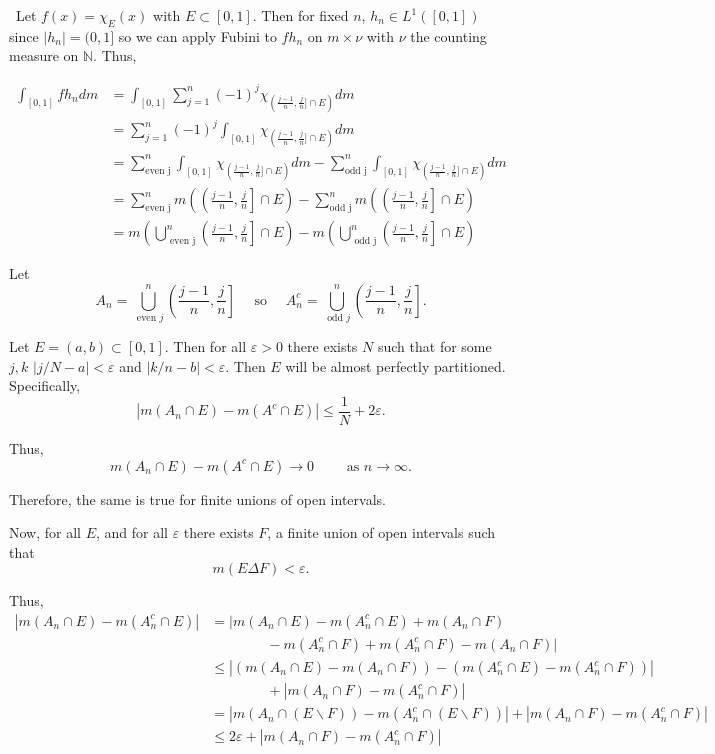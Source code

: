 \documentclass[12pt]{Homework}
\begin{document}
\begin{solution}$\,$
Let $f(x)=\chi_E(x)$ with $E\subset[0,1]$. Then for fixed $n$, $h_n\in L^1([0,1])$ since $|h_n|=(0,1]$ so we can apply Fubini to $fh_n$ on $m\times \nu$ with $\nu$ the counting measure on $\mathbb{N}$. Thus,

\begin{align*}
    \int_{[0,1]}fh_ndm&=\int_{[0,1]}\sum_{j=1}^n(-1)^j\chi_{(\frac{j-1}{n},\frac{j}{n}]\cap E)}dm\\
    &=\sum_{j=1}^n(-1)^j\int_{[0,1]}\chi_{(\frac{j-1}{n},\frac{j}{n}]\cap E)}dm\\
    &=\sum_{\text{even j}}^n\int_{[0,1]}\chi_{(\frac{j-1}{n},\frac{j}{n}]\cap E)}dm-\sum_{\text{odd j}}^n\int_{[0,1]}\chi_{(\frac{j-1}{n},\frac{j}{n}]\cap E)}dm\\
    &=\sum_{\text{even j}}^nm\left(\left(\frac{j-1}{n},\frac{j}{n}\right]\cap E\right)-\sum_{\text{odd j}}^nm\left(\left(\frac{j-1}{n},\frac{j}{n}\right]\cap E\right)\\
    &=m\left(\bigcup_{\text{ even j}}^n\left(\frac{j-1}{n},\frac{j}{n}\right]\cap E\right)-m\left(\bigcup_{\text{ odd j}}^n\left(\frac{j-1}{n},\frac{j}{n}\right]\cap E\right)
\end{align*}

Let $$A_n=\bigcup_{\text{ even }j}^n\left(\frac{j-1}{n},\frac{j}{n}\right]\quad\text{ so }\quad A_n^c=\bigcup_{\text{ odd }j}^n\left(\frac{j-1}{n},\frac{j}{n}\right].$$

Let $E=(a,b)\subset[0,1]$. Then for all $\varepsilon>0$ there exists $N$ such that for some $j,k$ $|j/N-a|<\varepsilon$ and $|k/n-b|<\varepsilon$. Then $E$ will be almost perfectly partitioned. Specifically, $$|m(A_n\cap E)-m(A^c\cap E)|\le\frac{1}{N}+2\varepsilon.$$ 

Thus, $$m(A_n\cap E)-m(A^c\cap E)\to0\qquad\text{ as }n\to\infty.$$

Therefore, the same is true for finite unions of open intervals. 

Now, for all $E$, and for all $\varepsilon$ there exists $F$, a finite union of open intervals such that $$m(E\Delta F)<\varepsilon.$$

Thus, \begin{align*}
    |m(A_n\cap E)-m(A_n^c\cap E)|&=|m(A_n\cap E)-m(A_n^c\cap E)+m(A_n\cap F)\\
    &\qquad\qquad-m(A_n^c\cap F)+m(A_n^c\cap F)-m(A_n\cap F)|\\
    &\le|(m(A_n\cap E)-m(A_n\cap F))-(m(A_n^c\cap E)-m(A_n^c\cap F))|\\
    &\qquad\qquad+|m(A_n\cap F)-m(A_n^c\cap F)|\\
    &=|m(A_n\cap (E\backslash F))-m(A_n^c\cap (E\backslash F))|+|m(A_n\cap F)-m(A_n^c\cap F)|\\
    &\le2\varepsilon+|m(A_n\cap F)-m(A_n^c\cap F)|
\end{align*}


\end{solution}
\end{document}
